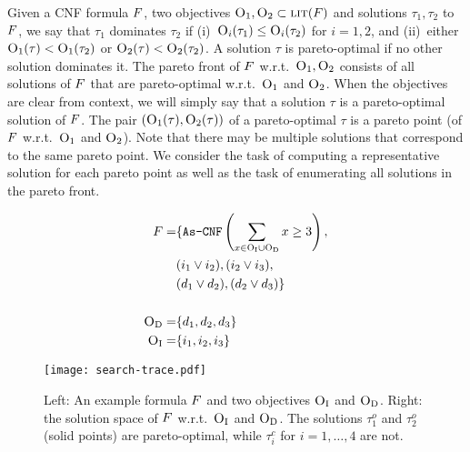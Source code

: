 
Given a CNF formula $F$, two objectives $\textsc{O}_1, \textsc{O}_2 \subset \textsc{lit}(F)$ and solutions $\tau_1, \tau_2$ to $F$, we say that $\tau_1$ dominates $\tau_2$ if (i)~$\textsc{O}_i(\tau_1) \leq \textsc{O}_i(\tau_2)$ for $i=1,2$, and (ii)~either $\textsc{O}_1(\tau) < \textsc{O}_1(\tau_2)$  or $\textsc{O}_2(\tau) < \textsc{O}_2(\tau_2)$.
A solution $\tau$ is pareto-optimal if no other solution dominates it.
The pareto front of $F$ w.r.t.\ $\textsc{O}_1, \textsc{O}_2$ consists of all solutions of $F$ that are pareto-optimal w.r.t.\ $\textsc{O}_1$ and $\textsc{O}_2$. 
When the objectives are clear from context, we will simply say that a solution $\tau$ is a pareto-optimal solution of $F$. 
The pair $(\textsc{O}_1(\tau),\textsc{O}_2(\tau))$ of a pareto-optimal $\tau$ is a pareto point (of $F$ w.r.t.\ $\textsc{O}_1$ and $\textsc{O}_2$).
Note that there may be multiple solutions that correspond to the same pareto point.
We consider the task of computing a representative solution for each pareto point as well as the task of enumerating all solutions in the pareto front.

\begin{figure}
  \begin{minipage}{0.36\textwidth}
  \footnotesize
  \begin{align*}
  F = &\{ \texttt{As-CNF}\left(\sum_ {x \in \textsc{O}_{\text{I}} \cup \textsc{O}_{\text{D}}} x \geq 3 \right), \\
  			&(i_1 \lor i_2),  (i_2 \lor i_3), \\
		 &(d_1 \lor d_2), (d_2 \lor d_3) \} \\ \\
  \textsc{O}_{\text{D}} =&\{ d_1,d_2, d_3\}   \\ 
  \textsc{O}_{\text{I}} =&\{ i_1,i_2, i_3\}  
  \end{align*}
  \end{minipage}
  \;
  \begin{minipage}{0.6\textwidth}
    \texttt{[image: search-trace.pdf]}
  \end{minipage}
  \caption{Left: An example formula $F$ and two objectives $\textsc{O}_{\text{I}}$ and $\textsc{O}_{\text{D}}$.
    Right: the solution space of $F$ w.r.t.\ $\textsc{O}_{\text{I}}$ and $\textsc{O}_{\text{D}}$.
    The solutions $\tau^o_1$ and $\tau^o_2$ (solid points) are pareto-optimal, while $\tau^c_i$ for $i=1,\ldots,4$ are not.\label{fig:search-trace}}
\end{figure}

